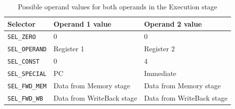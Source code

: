 \begin{table}[htbp]
    \center
    \begin{tabular}{|l|l|l|}
        \hline
        Selector               & Operand 1 value           & Operand 2 value           \\ \hline
        \texttt{SEL\_ZERO}     & 0                         & 0                         \\ \hline
        \texttt{SEL\_OPERAND}  & Register 1                & Register 2                \\ \hline
        \texttt{SEL\_CONST}    & 0                         & 4                         \\ \hline
        \texttt{SEL\_SPECIAL}  & PC                        & Immediate                 \\ \hline
        \texttt{SEL\_FWD\_MEM} & Data from Memory stage    & Data from Memory stage    \\ \hline
        \texttt{SEL\_FWD\_WB}  & Data from WriteBack stage & Data from WriteBack stage \\ \hline
    \end{tabular}
    \caption{Possible operand values for both operands in the Execution stage}
    \label{tab:exe-operands}
\end{table}
